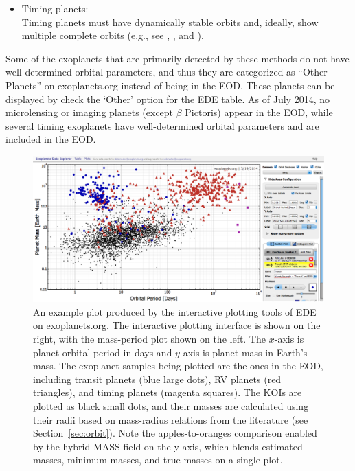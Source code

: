 \documentclass[11pt,preprint]{aastex}
\begin{document}
\begin{CJK*}{UTF8}{gbsn}
\begin{itemize}
\item Timing planets:\\
  Timing planets must have dynamically stable orbits and, ideally, show
  multiple complete orbits (e.g., see \citealt{Wittenmyer2012},
  \citealt{Horner2012}, and \citealt{Wittenmyer2013}). 

\end{itemize}
Some of the exoplanets that are primarily detected by these methods do
not have well-determined orbital parameters, and thus they are
categorized as ``Other Planets'' on exoplanets.org instead of being in
the EOD. These planets can be displayed by check the `Other' option
for the EDE table. As of July 2014, no microlensing or imaging
planets (except $\beta$ Pictoris) appear in the EOD, while several timing exoplanets have
well-determined orbital parameters and are included in the
EOD.


\begin{figure}[!htb]
\centering
\includegraphics[width=\textwidth]{../fig/mass-per-interactive.eps}
\caption{
  An example plot produced by the interactive plotting tools of
  EDE on exoplanets.org. The interactive plotting interface is shown
  on the right, with the mass-period plot shown on the left. The
  $x$-axis is planet orbital period in days and $y$-axis is planet
  mass in Earth's mass. The exoplanet samples being plotted are the
  ones in the EOD, including transit planets (blue large dots), RV
  planets (red triangles), and timing planets (magenta squares). The
  KOIs are plotted as black small dots, and their masses are
  calculated using their radii based on mass-radius relations from the
  literature (see Section~\ref{sec:orbit}).  Note the
  apples-to-oranges comparison enabled by the hybrid MASS field on the y-axis, which blends estimated
  masses, minimum masses, and true masses on a single plot.}
\label{fig:koi}
\end{figure}


\end{CJK*}
\end{document}
